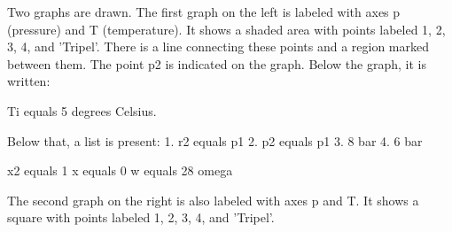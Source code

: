 Two graphs are drawn. The first graph on the left is labeled with axes p (pressure) and T (temperature). It shows a shaded area with points labeled 1, 2, 3, 4, and 'Tripel'. There is a line connecting these points and a region marked between them. The point p2 is indicated on the graph. Below the graph, it is written: 

Ti equals 5 degrees Celsius.

Below that, a list is present:
1. r2 equals p1
2. p2 equals p1
3. 8 bar
4. 6 bar

x2 equals 1
x equals 0
w equals 28 omega

The second graph on the right is also labeled with axes p and T. It shows a square with points labeled 1, 2, 3, 4, and 'Tripel'.